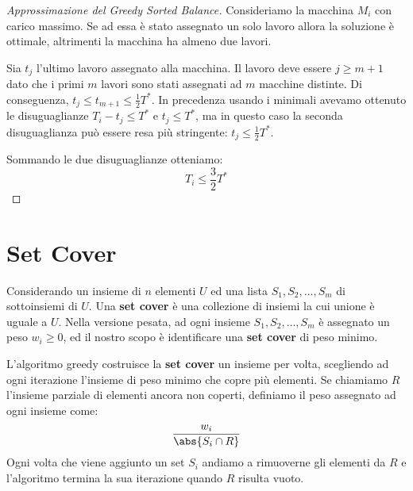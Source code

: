 \documentclass[\main/main.tex]{subfiles}
\begin{document}
\begin{proof}[Approssimazione del Greedy Sorted Balance]
    Consideriamo la macchina \(M_i\) con carico massimo. Se ad essa è stato assegnato un solo lavoro allora la soluzione è ottimale, altrimenti la macchina ha almeno due lavori.
    
    Sia \(t_j\) l'ultimo lavoro assegnato alla macchina. Il lavoro deve essere \(j \geq m+1\) dato che i primi \(m\) lavori sono stati assegnati ad \(m\) macchine distinte. Di conseguenza, \(t_j \leq t_{m+1} \leq \frac{1}{2} T^*\). In precedenza usando i minimali avevamo ottenuto le disuguaglianze \(T_{i}-t_{j} \leq T^{*}\) e \(t_{j} \leq T^{*}\), ma in questo caso la seconda disuguaglianza può essere resa più stringente: \(t_{j} \leq \frac{1}{2} T^{*}\).
    
    Sommando le due disuguaglianze otteniamo:
    \[
        T_{i} \leq \frac{3}{2} T^{*}
    \]
\end{proof}
\section{Set Cover}
\begin{problem}
    Considerando un insieme di \(n\) elementi \(U\) ed una lista \(S_1, S_2, \ldots, S_m\) di sottoinsiemi di \(U\). Una \textbf{set cover} è una collezione di insiemi la cui unione è uguale a \(U\). Nella versione pesata, ad ogni insieme \(S_1, S_2, \ldots, S_m\) è assegnato un peso \(w_i \geq 0\), ed il nostro scopo è identificare una \textbf{set cover} di peso minimo.
\end{problem}
\begin{definition}
    L'algoritmo greedy costruisce la \textbf{set cover} un insieme per volta, scegliendo ad ogni iterazione l'insieme di peso minimo che copre più elementi. Se chiamiamo \(R\) l'insieme parziale di elementi ancora non coperti, definiamo il peso assegnato ad ogni insieme come:
    \[
        \frac{w_i}{\abs{S_i \cap R}}
    \]
    Ogni volta che viene aggiunto un set \(S_i\) andiamo a rimuoverne gli elementi da \(R\) e l'algoritmo termina la sua iterazione quando \(R\) risulta vuoto.
\end{definition}
\end{document}
